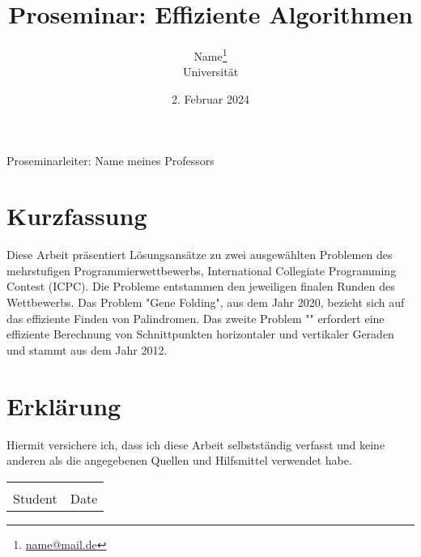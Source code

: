 \documentclass[11pt,a4paper]{scrartcl}
\begin{document}
%
\titlehead{\texttt{[image: ]}} %
\title{Proseminar: Effiziente Algorithmen}

\author{Name\thanks{\href{mailto:name@mail.de}{name@mail.de}} \\Universität}
\date{2. Februar 2024}
\maketitle
\vfill
Proseminarleiter: Name meines Professors
\newpage
\renewcommand\abstractname{Kurzfassung}
\section*{\abstractname}
Diese Arbeit präsentiert Lösungsansätze zu zwei ausgewählten Problemen des mehrstufigen Programmierwettbewerbs, International Collegiate Programming Contest (ICPC). Die Probleme entstammen den jeweiligen finalen Runden des Wettbewerbs. Das Problem "Gene Folding", aus dem Jahr 2020, bezieht sich auf das effiziente Finden von Palindromen. Das zweite Problem "" \string erfordert eine effiziente Berechnung von Schnittpunkten horizontaler und vertikaler Geraden und stammt aus dem Jahr 2012.
\thispagestyle{empty}
%
%
\tableofcontents
\thispagestyle{empty}
\cleardoublepage
{} 
\newpage
%
%

%

%

%

\vfill
\newpage
\section*{Erklärung}
Hiermit versichere ich, dass ich diese Arbeit selbstständig verfasst und keine anderen als die angegebenen Quellen und Hilfsmittel verwendet habe.
\begin{tabular}{@{}p{2.5in}p{2.5in}@{}}
 \\[5\bigskipamount]
  \dotfill & \dotfill \\
  Student & Date
  \centering
  
\end{tabular}
\end{document}
